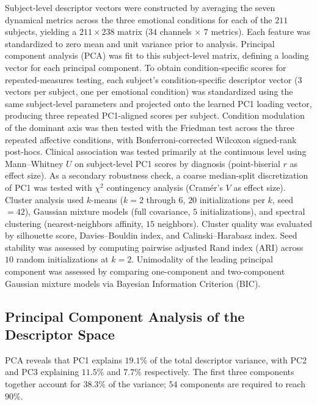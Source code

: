Subject-level descriptor vectors were constructed by averaging the seven dynamical metrics across the three emotional conditions for each of the $211$ subjects, yielding a $211 \times 238$ matrix ($34$ channels $\times$ $7$ metrics). Each feature was standardized to zero mean and unit variance prior to analysis. Principal component analysis (PCA) was fit to this subject-level matrix, defining a loading vector for each principal component. To obtain condition-specific scores for repeated-measures testing, each subject's condition-specific descriptor vector ($3$ vectors per subject, one per emotional condition) was standardized using the same subject-level parameters and projected onto the learned PC1 loading vector, producing three repeated PC1-aligned scores per subject. Condition modulation of the dominant axis was then tested with the Friedman test across the three repeated affective conditions, with Bonferroni-corrected Wilcoxon signed-rank post-hocs. Clinical association was tested primarily at the continuous level using Mann--Whitney $U$ on subject-level PC1 scores by diagnosis (point-biserial $r$ as effect size). As a secondary robustness check, a coarse median-split discretization of PC1 was tested with $\chi^2$ contingency analysis (Cram\'{e}r's $V$ as effect size). Cluster analysis used $k$-means ($k = 2$ through $6$, $20$ initializations per $k$, seed $= 42$), Gaussian mixture models (full covariance, $5$ initializations), and spectral clustering (nearest-neighbors affinity, $15$ neighbors). Cluster quality was evaluated by silhouette score, Davies--Bouldin index, and Calinski--Harabasz index. Seed stability was assessed by computing pairwise adjusted Rand index (ARI) across $10$ random initializations at $k = 2$. Unimodality of the leading principal component was assessed by comparing one-component and two-component Gaussian mixture models via Bayesian Information Criterion (BIC).

\subsection{Principal Component Analysis of the Descriptor Space}

PCA reveals that PC1 explains $19.1\%$ of the total descriptor variance, with PC2 and PC3 explaining $11.5\%$ and $7.7\%$ respectively. The first three components together account for $38.3\%$ of the variance; $54$ components are required to reach $90\%$.

